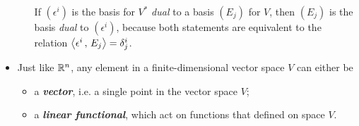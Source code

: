 \documentclass[11pt]{article}
\begin{document}
\begin{itemize}
\begin{remark}
\begin{itemize}
If $(\epsilon^i)$ is the basis for $V^{*}$ \emph{dual} to a basis $(E_j)$ for $V$, then $(E_j)$ is the basis \emph{dual} to $(\epsilon^i)$, because both statements are equivalent to the relation $\left\langle \epsilon^i\,,\, E_j \right\rangle = \delta_j^i$.
\end{itemize}
\end{remark}

\item Just like ${\mathbb R}^{n}$, any element in a finite-dimensional vector space $V$ can either be
\begin{itemize}
\item a \emph{\textbf{vector}}, i.e. a single point in the vector space $V$;
\item a \emph{\textbf{linear functional}}, which act on functions that defined on space $V$.
\end{itemize}
\end{itemize}
\end{document}
